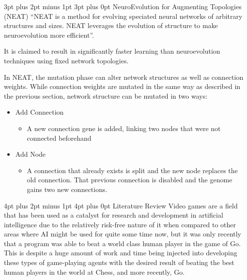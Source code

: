\documentclass[12pt,a4paper]{article}
\makeatletter
\renewcommand\subsection{\@startsection {subsection}{1}{2mm} %
                               {3pt plus 2pt minus 1pt} %
                               {3pt plus 0pt} %
                               {\normalfont\bfseries}}
\renewcommand\section{\@startsection {section}{1}{0mm} %
                               {4pt plus 2pt minus 1pt} %
                               {4pt plus 0pt} %
                               {\bfseries}}
\makeatother
\begin{document}
\subsection{NeuroEvolution for Augmenting Topologies (NEAT)}
\enquote{NEAT is a method for evolving speciated neural networks of arbitrary structures and sizes. NEAT leverages the evolution of structure to make neuroevolution more efficient}\citep{NEAT}.

It is claimed to result in significantly faster learning than neuroevolution techniques using fixed network topologies.
 
 In NEAT, the mutation phase can alter network structures as well as connection weights\citep{EfficientEvolutionOfNeuralNetworkTopologies}. While connection weights are mutated in the same way as described in the previous section, network structure can be mutated in two ways:
 
 \begin{itemize}
 	\item Add Connection
 	\begin{itemize}
 		\item A new connection gene is added, linking two nodes that were not connected beforehand
 	\end{itemize}
 	\item Add Node
 	\begin{itemize}
 		\item A connection that already exists is split and the new node replaces the old connection. That previous connection is disabled and the genome gains two new connections. 
 	\end{itemize}
 \end{itemize}
 
 

\newpage
\section{Literature Review}
Video games are a field that has been used as a catalyst for research and development in artificial intelligence due to the relatively risk-free nature of it when compared to other areas where AI might be used for quite some time now, but it was only recently that a program was able to beat a world class human player in the game of Go\citep{ABriefHistoryOfGameAI}. This is despite a huge amount of work and time being injected into developing these types of game-playing agents with the desired result of beating the best human players in the world at Chess, and more recently, Go. 
\end{document}
